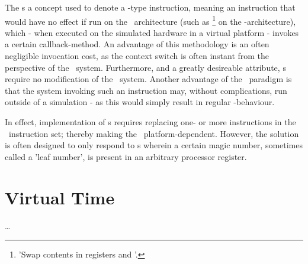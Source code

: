 The \dvttermmagicinstruction s a concept used to denote a -type instruction, meaning an instruction that would have no effect if run on the \dvttermtarget\ architecture (such as \footnote{'Swap contents in registers  and '.} on the \dvttermxeightysix -architecture), which - when executed on the simulated hardware in a virtual platform - invokes a certain callback-method.
An advantage of this methodology is an often negligible invocation cost, as the context switch is often instant from the perspective of the \dvttermtarget\ system.
Furthermore, and a greatly desireable attribute, \dvttermmagicinstruction s require no modification of the \dvttermtarget\ system.
Another advantage of the \dvttermmagicinstruction\ paradigm is that the system invoking such an instruction may, without complications, run outside of a simulation - as this would simply result in regular -behaviour.

In effect, implementation of \dvttermmagicinstruction s requires replacing one- or more instructions in the \dvttermtarget\ instruction set; thereby making the \dvttermmagicinstruction\ platform-dependent.
However, the solution is often designed to only respond to \dvttermmagicinstruction s wherein a certain magic number, sometimes called a 'leaf number', is present in an arbitrary processor register.

\section{Virtual Time}
\label{sec:background_virtualtime}
\ldots

